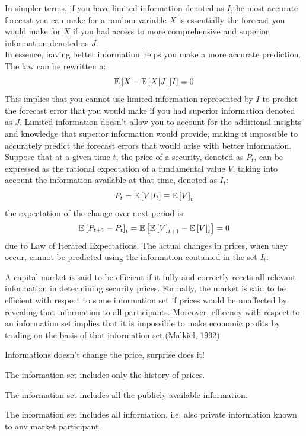In simpler terms, if you have limited information denoted as $I$,the most accurate forecast you can make for a random variable $X$ is essentially the forecast you would make for $X$  if you had access to more comprehensive and superior information denoted as $J$.\\ In essence, having better information helps you make a more accurate prediction.\\
The law can be rewritten a:
\[
\mathbb{E}\left[X - \mathbb{E}\left[X|J\right]|I\right] = 0
\]
This implies that you cannot use limited information represented by $I$ to predict the forecast error that you would make if you had superior information denoted as $J$. Limited information doesn't allow you to account for the additional insights and knowledge that superior information would provide, making it impossible to accurately predict the forecast errors that would arise with better information.\\
Suppose that at a given time $t$, the price of a security, denoted as $P_t$, can be expressed as the rational expectation of a fundamental value $V$, taking into account the information available at that time, denoted as $I_t$:
\[
P_t = \mathbb{E}\left[V | I_t\right] \equiv \mathbb{E}\left[V\right]_t
\]
the expectation of the change over next period is:
\[
\mathbb{E}\left[P_{t+1}-P_t\right]_t = \mathbb{E}\left[\mathbb{E}\left[V\right]_{t+1}-\mathbb{E}\left[V\right]_{t}\right] = 0
\]
due to Law of Iterated Expectations. The actual changes in prices, when they occur, cannot be predicted using the information contained in the set $I_t$.
\begin{myquote}
A capital market is said to be efficient if it fully and correctly reects all relevant
information in determining security prices. Formally, the market is said to be efficient with respect to some information set if prices would be unaffected by revealing that information to all participants. Moreover, efficency with respect to an information set implies that it is impossible to make economic profits by trading on the basis of that information set.(Malkiel, 1992)
\end{myquote}
Informations doesn't change the price, surprise does it!
\begin{mydefinition}
	The information set includes only the history of prices.
\end{mydefinition}
\begin{mydefinition}
	The information set includes all the publicly available information.
\end{mydefinition}
\begin{mydefinition}
	The information set includes all information, i.e. also private information known to any market participant.
\end{mydefinition}
